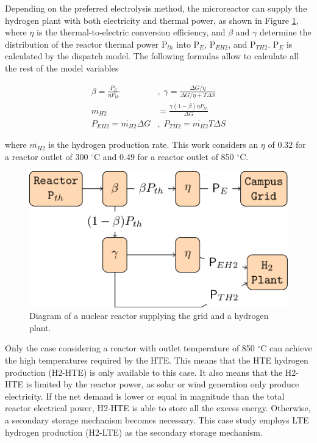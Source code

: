 \documentclass{anstrans}
\begin{document}
Depending on the preferred electrolysis method, the microreactor can supply the hydrogen plant with both electricity and thermal power, as shown in Figure \ref{fig:reactor-hydrogen}, where $\eta$ is the thermal-to-electric conversion efficiency, and $\beta$ and $\gamma$ determine the distribution of the reactor thermal power P$_{th}$ into P$_E$, P$_{EH2}$, and P$_{TH2}$.
P$_E$ is calculated by the dispatch model.
The following formulas allow to calculate all the rest of the model variables

\begin{align}
  \beta = \frac{P_{E}}{\eta P_{th}}&, \; \gamma = \frac{\Delta G / \eta}{\Delta G / \eta + T \Delta S} \\
  \dot{m_{H2}} &= \frac{\gamma (1-\beta) \eta P_{th}}{\Delta G} \\
  P_{EH2} = \dot{m_{H2}} \Delta G&, \;  P_{TH2} = \dot{m_{H2}} T \Delta S
\end{align}

where $\dot{m_{H2}}$ is the hydrogen production rate.
This work considers an $\eta$ of 0.32 for a reactor outlet of 300 $^\circ$C and 0.49 for a reactor outlet of 850 $^\circ$C.

\begin{figure}[htbp!] %
    \centering
    \includegraphics[width=0.90\linewidth]{figures/reactor-hydrogen}
    \hfill
    \caption{Diagram of a nuclear reactor supplying the grid and a hydrogen plant.}
    \label{fig:reactor-hydrogen}
\end{figure}

Only the case considering a reactor with outlet temperature of 850 $^\circ$C can achieve the high temperatures required by the HTE.
This means that the HTE hydrogen production (H2-HTE) is only available to this case.
It also means that the H2-HTE is limited by the reactor power, as solar or wind generation only produce electricity.
If the net demand is lower or equal in magnitude than the total reactor electrical power, H2-HTE is able to store all the excess energy.
Otherwise, a secondary storage mechanism becomes necessary.
This case study employs LTE hydrogen production (H2-LTE) as the secondary storage mechanism.
\end{document}
